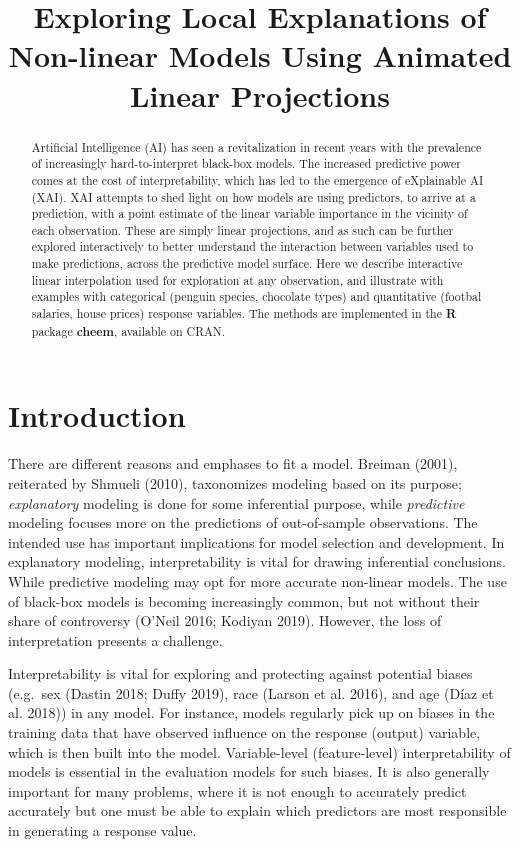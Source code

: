 \documentclass[
]{article}
\title{Exploring Local Explanations of Non-linear Models Using Animated
Linear Projections}
\author{}
\date{\vspace{-2.5em}}
\begin{document}
\maketitle
\begin{abstract}
Artificial Intelligence (AI) has seen a revitalization in recent years
with the prevalence of increasingly hard-to-interpret black-box models.
The increased predictive power comes at the cost of interpretability,
which has led to the emergence of eXplainable AI (XAI). XAI attempts to
shed light on how models are using predictors, to arrive at a
prediction, with a point estimate of the linear variable importance in
the vicinity of each observation. These are simply linear projections,
and as such can be further explored interactively to better understand
the interaction between variables used to make predictions, across the
predictive model surface. Here we describe interactive linear
interpolation used for exploration at any observation, and illustrate
with examples with categorical (penguin species, chocolate types) and
quantitative (footbal salaries, house prices) response variables. The
methods are implemented in the \textbf{R} package \textbf{cheem},
available on CRAN.
\end{abstract}

\hypertarget{sec:intro}{%
\section{Introduction}\label{sec:intro}}

There are different reasons and emphases to fit a model. Breiman (2001),
reiterated by Shmueli (2010), taxonomizes modeling based on its purpose;
\emph{explanatory} modeling is done for some inferential purpose, while
\emph{predictive} modeling focuses more on the predictions of
out-of-sample observations. The intended use has important implications
for model selection and development. In explanatory modeling,
interpretability is vital for drawing inferential conclusions. While
predictive modeling may opt for more accurate non-linear models. The use
of black-box models is becoming increasingly common, but not without
their share of controversy (O'Neil 2016; Kodiyan 2019). However, the
loss of interpretation presents a challenge.

Interpretability is vital for exploring and protecting against potential
biases (e.g.~sex (Dastin 2018; Duffy 2019), race (Larson et al. 2016),
and age (Díaz et al. 2018)) in any model. For instance, models regularly
pick up on biases in the training data that have observed influence on
the response (output) variable, which is then built into the model.
Variable-level (feature-level) interpretability of models is essential
in the evaluation models for such biases. It is also generally important
for many problems, where it is not enough to accurately predict
accurately but one must be able to explain which predictors are most
responsible in generating a response value.
\end{document}
